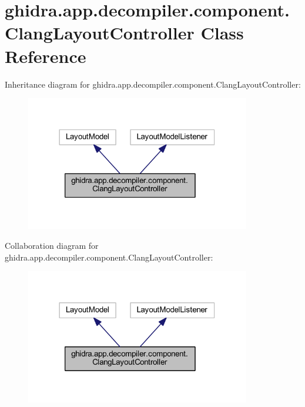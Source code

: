 \hypertarget{classghidra_1_1app_1_1decompiler_1_1component_1_1_clang_layout_controller}{}\section{ghidra.\+app.\+decompiler.\+component.\+Clang\+Layout\+Controller Class Reference}
\label{classghidra_1_1app_1_1decompiler_1_1component_1_1_clang_layout_controller}


Inheritance diagram for ghidra.\+app.\+decompiler.\+component.\+Clang\+Layout\+Controller\+:
\nopagebreak
\begin{figure}[H]
\begin{center}
\leavevmode
\includegraphics[width=278pt]{classghidra_1_1app_1_1decompiler_1_1component_1_1_clang_layout_controller__inherit__graph}
\end{center}
\end{figure}


Collaboration diagram for ghidra.\+app.\+decompiler.\+component.\+Clang\+Layout\+Controller\+:
\nopagebreak
\begin{figure}[H]
\begin{center}
\leavevmode
\includegraphics[width=278pt]{classghidra_1_1app_1_1decompiler_1_1component_1_1_clang_layout_controller__coll__graph}
\end{center}
\end{figure}
